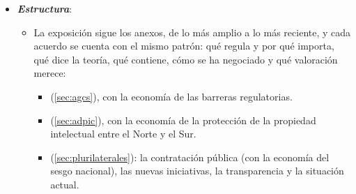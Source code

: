 \documentclass[11pt]{article}
\begin{document}
\begin{itemize}
\item \textbf{\emph{Estructura}}:
  \begin{itemize}
  \item La exposición sigue los anexos, de lo más amplio a lo más reciente, y cada acuerdo se cuenta con el mismo patrón: qué regula y por qué importa, qué dice la teoría, qué contiene, cómo se ha negociado y qué valoración merece:
    \begin{itemize}
    \item {} (\ref{sec:agcs}), con la economía de las barreras regulatorias.
    \item {} (\ref{sec:adpic}), con la economía de la protección de la propiedad intelectual entre el Norte y el Sur.
    \item {} (\ref{sec:plurilaterales}): la contratación pública (con la economía del sesgo nacional), las nuevas iniciativas, la transparencia y la situación actual.
    \end{itemize}
  \end{itemize}
\end{itemize}

\begin{infografia}[H]
\centering
\caption{Los acuerdos de la OMC distintos de los de mercancías: el mapa de la exposición}\label{figu:mapa}
\end{infografia}
\end{document}

